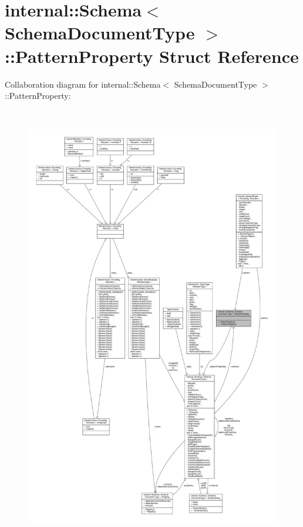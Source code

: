 \hypertarget{structinternal_1_1Schema_1_1PatternProperty}{}\section{internal\+:\+:Schema$<$ Schema\+Document\+Type $>$\+:\+:Pattern\+Property Struct Reference}
\label{structinternal_1_1Schema_1_1PatternProperty}


Collaboration diagram for internal\+:\+:Schema$<$ Schema\+Document\+Type $>$\+:\+:Pattern\+Property\+:
\nopagebreak
\begin{figure}[H]
\begin{center}
\leavevmode
\includegraphics[height=550pt]{structinternal_1_1Schema_1_1PatternProperty__coll__graph}
\end{center}
\end{figure}
